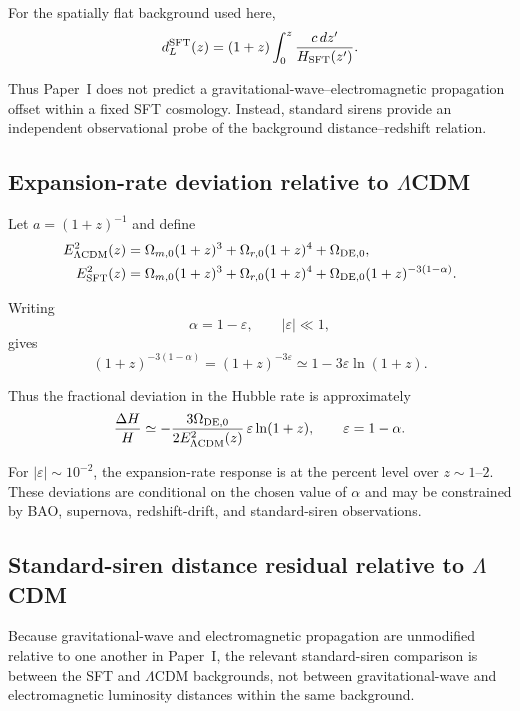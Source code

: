 \documentclass[12pt]{article}
\begin{document}
For the spatially flat background used here,
\begin{equation}
d_L^{\rm SFT}(z)
=
(1+z)
\int_0^z
\frac{c\,dz'}{H_{\rm SFT}(z')}.
\label{eq:dL_SFT_siren}
\end{equation}

Thus Paper~I does not predict a gravitational-wave--electromagnetic
propagation offset within a fixed SFT cosmology. Instead, standard
sirens provide an independent observational probe of the background
distance--redshift relation.


\subsection{Expansion-rate deviation relative to $\Lambda$CDM}

Let $a=(1+z)^{-1}$ and define
\begin{align}
E_{\Lambda{\rm CDM}}^2(z)
&=
\Omega_{m,0}(1+z)^3
+\Omega_{r,0}(1+z)^4
+\Omega_{{\rm DE},0},
\\
E_{\rm SFT}^2(z)
&=
\Omega_{m,0}(1+z)^3
+\Omega_{r,0}(1+z)^4
+\Omega_{{\rm DE},0}(1+z)^{-3(1-\alpha)}.
\end{align}

Writing
\[
\alpha=1-\varepsilon,
\qquad
|\varepsilon|\ll1,
\]
gives
\[
(1+z)^{-3(1-\alpha)}
=
(1+z)^{-3\varepsilon}
\simeq
1-3\varepsilon\ln(1+z).
\]

Thus the fractional deviation in the Hubble rate is approximately
\begin{equation}
\frac{\Delta H}{H}
\simeq
-\frac{3\Omega_{{\rm DE},0}}
{2E_{\Lambda{\rm CDM}}^2(z)}
\,\varepsilon\ln(1+z),
\qquad
\varepsilon=1-\alpha.
\label{eq:deltaH_over_H_firstorder}
\end{equation}

For $|\varepsilon|\sim10^{-2}$, the expansion-rate response is at the
percent level over $z\sim1$--$2$. These deviations are conditional on
the chosen value of $\alpha$ and may be constrained by BAO,
supernova, redshift-drift, and standard-siren observations.


\subsection{Standard-siren distance residual relative to $\Lambda$CDM}

Because gravitational-wave and electromagnetic propagation are
unmodified relative to one another in Paper~I, the relevant
standard-siren comparison is between the SFT and $\Lambda$CDM
backgrounds, not between gravitational-wave and electromagnetic
luminosity distances within the same background.
\end{document}
